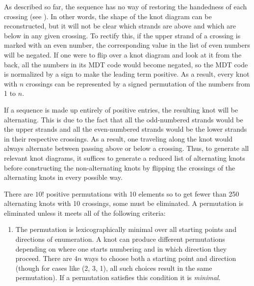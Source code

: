\begin{paper}
As described so far, the sequence has no way of restoring the handedness of each
crossing (see \figCrossings).
In other words, the shape of the knot diagram can be reconstructed, but it will
not be clear which strands are above and which are below in any given crossing.
To rectify this, if the upper strand of a crossing is marked with an even
number, the corresponding value in the list of even numbers will be negated.
If one were to flip over a knot diagram and look at it from the back, all the
numbers in its MDT code would become negated, so the MDT code is normalized by a
sign to make the leading term positive.
As a result, every knot with $n$ crossings can be represented by a signed
permutation of the numbers from 1 to $n$.


If a sequence is made up entirely of positive entries, the resulting knot will
be alternating.
This is due to the fact that all the odd-numbered strands would be the upper
strands and all the even-numbered strands would be the lower strands in their
respective crossings.
As a result, one traveling along the knot would always alternate between passing
above or below a crossing.
Thus, to generate all relevant knot diagrams, it suffices to generate a reduced
list of alternating knots before constructing the non-alternating knots by
flipping the crossings of the alternating knots in every possible way.

There are $10!$ positive permutations with 10 elements so to get fewer than 250
alternating knots with 10 crossings, some must be eliminated.
A permutation is eliminated unless it meets all of the following criteria:

\begin{enumerate}
\item The permutation is lexicographically minimal over all starting points and
directions of enumeration.
A knot can produce different permutations depending on where one starts
numbering and in which direction they proceed.
There are $4n$ ways to choose both a starting point and direction (though for
cases like (2, 3, 1), all such choices result in the same permutation).
If a permutation satisfies this condition it is \textit{minimal}.


\end{enumerate}
\end{paper}
